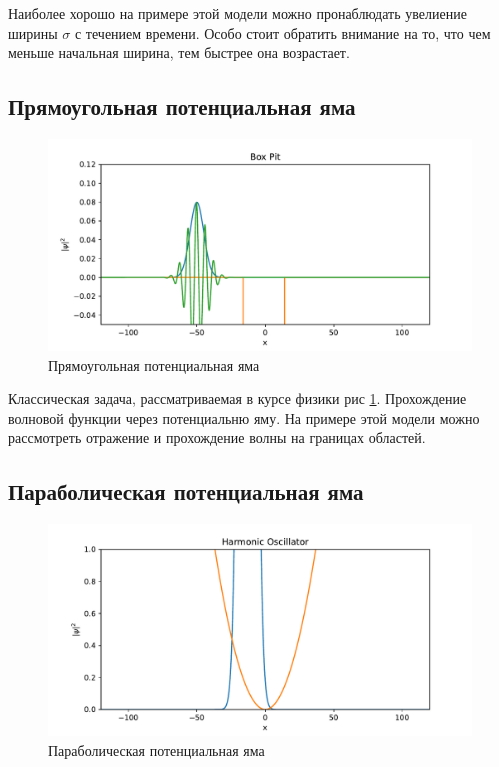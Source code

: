 \documentclass[a4paper, 12pt]{article}
\begin{document}
    Наиболее хорошо на примере этой модели можно пронаблюдать увелиение ширины $\sigma$ с течением времени.
    Особо стоит обратить внимание на то, что чем меньше начальная ширина, тем быстрее она возрастает.
    
    \subsection{Прямоугольная потенциальная яма}

    \begin{figure}
        \centering
        \includegraphics[scale=0.5]{images/BoxPit.pdf}
        \caption{Прямоугольная потенциальная яма}
        \label{fig:BoxPit}
    \end{figure}

    Классическая задача, рассматриваемая в курсе физики рис \ref{fig:BoxPit}. Прохождение волновой функции через потенциальню яму.
    На примере этой модели можно рассмотреть отражение и прохождение волны на границах областей.
    
    \subsection{Параболическая потенциальная яма}

    \begin{figure}
        \centering
        \includegraphics[scale=0.5]{images/HarmonicOscillator.pdf}
        \caption{Параболическая потенциальная яма}
        \label{fig:HarmonicOscillator}
    \end{figure}
\end{document}
